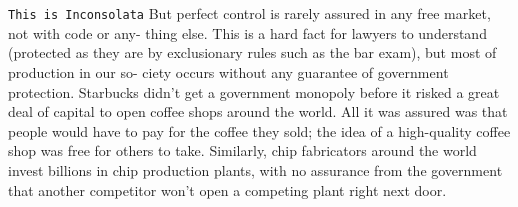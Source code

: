 \documentclass[a4paper,10pt]{article}
\title{}
\author{}
\begin{document}
\maketitle

\begin{abstract}

\end{abstract}

\section{}
\texttt{This is Inconsolata}
But perfect control is rarely assured in any free market, not with code or any-
thing else.
This is a hard fact for lawyers to understand (protected as they are by
exclusionary rules such as the bar exam), but most of production in our so-
ciety occurs without any guarantee of government protection. Starbucks
didn’t get a government monopoly before it risked a great deal of capital
to open coffee shops around the world. All it was assured was that people
would have to pay for the coffee they sold; the idea of a high-quality coffee
shop was free for others to take. Similarly, chip fabricators around the world
invest billions in chip production plants, with no assurance from the
government that another competitor won’t open a competing plant right
next door.
\end{document}
